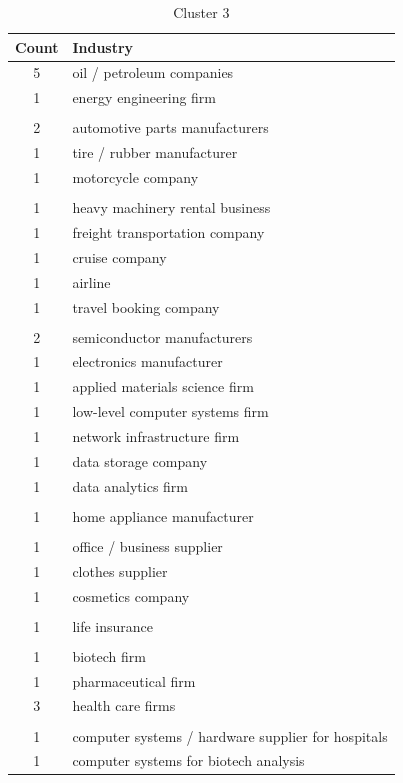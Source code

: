 \documentclass[final]{article}
\begin{document}
\begin{table}[H]
\centering
\caption{Cluster 3}
\label{c3}
\begin{tabular}{@{}cl@{}}
  \toprule
  Count & Industry \\ \midrule
  5 & oil / petroleum companies \\
  1 & energy engineering firm \\
    & \\
  2 & automotive parts manufacturers \\
  1 & tire / rubber manufacturer \\
  1 & motorcycle company \\
    & \\
  1 & heavy machinery rental business \\
  1 & freight transportation company \\
  1 & cruise company \\
  1 & airline \\
  1 & travel booking company \\
    & \\
  2 & semiconductor manufacturers \\
  1 & electronics manufacturer \\
  1 & applied materials science firm \\
  1 & low-level computer systems firm \\
  1 & network infrastructure firm \\
  1 & data storage company \\
  1 & data analytics firm  \\
    & \\
  1 & home appliance manufacturer \\
  & \\
  1 & office / business supplier \\
  1 & clothes supplier \\
  1 & cosmetics company \\
  & \\
  1 & life insurance \\
  & \\
  1 & biotech firm \\
  1 & pharmaceutical firm \\
  3 & health care firms \\
  & \\
  1 & computer systems / hardware supplier for hospitals \\
  1 & computer systems for biotech analysis \\

\end{tabular}
\end{table}
\end{document}
